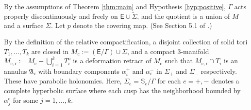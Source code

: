 \documentclass{amsart}
\numberwithin{equation}{section}
\newcommand\Ss{{\mathbb{S}}}
\newcommand\Lspace{\mathsf E}
\theoremstyle{definition}
\theoremstyle{remark}
\newcommand{\rome}{\mathrm e}
\newcommand{\romec}{\mathrm{c}}
\newcommand{\romecr}{{\mathrm{c}, \mathrm{r}}}
\begin{document}




By the assumptions of Theorem \ref{thm:main} and Hypothesis \ref{hyp:positive}, 
$\Gamma$ acts properly discontinuously and freely on
$\Lspace \cup \tilde \Sigma$, and 
the quotient is a union of $M$ and a surface $\Sigma$. 
Let $p$ denote the covering map. (See Section 5.1 of \cite{CDG22}.) 


By the definition of the relative compactification, 
a disjoint collection of solid tori 
$T_1, \dots, T_k$ are closed in $M_\romec:= (\Lspace/\Gamma) \cup \Sigma$, 
and a compact $3$-manifold $M_\romecr:= M_\romec - \bigcup_{i=1}^k T_i^o$ is a deformation retract of $M_\romec$ such that
$M_\romecr \cap T_i$ is an annulus ${\mathfrak{A}}_i$ with boundary components 
$\alpha_i^+$ and $\alpha_i^-$ in $\Sigma_+$ and $\Sigma_-$ respectively. 
These have parabolic holonomies. 
Here, $\Sigma_e = \Ss_e/\Gamma$ for each $e=+, -$ denotes a complete hyperbolic surface 
where each cusp has the neighborhood bounded by 
$\alpha_j^{\rome}$ for some $j=1, \dots, k$. 
\end{document}
